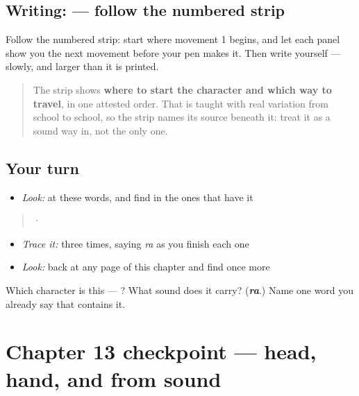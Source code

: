 \subsection*{Writing:  — follow the numbered strip}

Follow the numbered strip: start where movement 1 begins, and let each panel show you the next movement before your pen makes it. Then write  yourself — slowly, and larger than it is printed.

\begin{quote}
The strip shows \textbf{where to start the character and which way to travel}, in one attested order. That is taught with real variation from school to school, so the strip names its source beneath it: treat it as a sound way in, not the only one.
\end{quote}

\subsection*{Your turn}
\begin{itemize}
\raggedright
  \item \emph{Look:} at these words, and find  in the ones that have it
\end{itemize}

\begin{quote}
  ·  
\end{quote}

\begin{itemize}
\raggedright
  \item \emph{Trace it:}  three times, saying \emph{ra} as you finish each one
  \item \emph{Look:} back at any page of this chapter and find  once more
\end{itemize}

\begin{tcolorbox}[breakable,colback=teal!4,colframe=teal!35!black,title={Before you move on}]
Which character is this — ? What sound does it carry? (\emph{\textbf{ra}}.) Name one word you already say that contains it.
\end{tcolorbox}
\section[Practice]{Chapter 13 checkpoint — head, hand, and  from sound}

